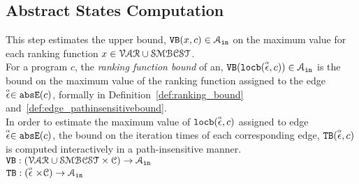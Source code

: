   \subsection{Abstract States Computation}
  This step estimates the upper bound, ${\mathtt{VB}}(x, c) \in \mathcal{A}_{\mathtt{in}}$
  on the maximum value for each ranking function   $x \in  \mathcal{VAR} \cup \mathcal{SMBCST}$.
  \\
  For a program $c$, the \emph{ranking function bound} of an,
  ${\mathtt{VB}}(\mathtt{locb}(\stackrel{\scriptscriptstyle{\alpha}}{\mathtt{\epsilon}{}}, c)) \in \mathcal{A}_{\mathtt{in}}$ is 
  the bound on the maximum value of the ranking function  
  assigned to the edge $\stackrel{\scriptscriptstyle{\alpha}}{\mathtt{\epsilon}{}} \in \mathtt{abs}{\mathtt{E}}(c)$, formally in Definition~\ref{def:ranking_bound} and~\ref{def:edge_pathinsensitivebound}.
  \\
  In order to estimate the maximum value of $\mathtt{locb}(\stackrel{\scriptscriptstyle{\alpha}}{\mathtt{\epsilon}{}}, c)$ assigned to edge $\stackrel{\scriptscriptstyle{\alpha}}{\mathtt{\epsilon}{}} \in \mathtt{abs}{\mathtt{E}}(c)$,
  the bound on the iteration times of each corresponding edge, ${\mathtt{TB}}(\stackrel{\scriptscriptstyle{\alpha}}{\mathtt{\epsilon}{}}, c)$ 
  is computed interactively in a path-insensitive manner.
  \\ 
  $ {\mathtt{VB}}: (\mathcal{VAR} \cup \mathcal{SMBCST}  \times \mathcal{C}) \to \mathcal{A}_{\mathtt{in}}$
  \\
  ${\mathtt{TB}}: (\stackrel{\scriptscriptstyle{\alpha}}{\mathtt{\epsilon}{}} \times \mathcal{C}) \to \mathcal{A}_{\mathtt{in}}$
